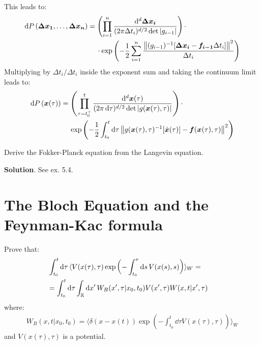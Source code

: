 \documentclass[../template.tex]{subfiles}
\begin{document}
\begin{exo}
    This leads to:
    \begin{align*}
        \dd{P}(\bm{\Delta x_1}, \dots,\bm{\Delta x_n}) &= \left(\prod_{i=1}^n \frac{\dd[d]{ \bm{\Delta x_i}}}{(2 \pi \Delta t_i)^{d/2} \operatorname{det}|g_{i-1}| }   \right) \cdot\\
        &\quad \> \cdot \exp\left(-\frac{1}{2} \sum_{i=1}^n \frac{\norm{(g_{i-1})^{-1} [ \bm{\Delta x_i} - \bm{f_{i-1}}\Delta t_i]}^2 }{\Delta t_i}  \right)
    \end{align*}
    Multiplying by $\Delta t_i / \Delta t_i$ inside the exponent sum and taking the continuum limit leads to:
    \begin{align*}
        \dd{P}(\bm{x}(\tau)) &= \left(\prod_{\tau=t_0^+}^t \frac{\dd[d]{\bm{x}(\tau)}}{(2 \pi \dd{\tau} )^{d/2} \operatorname{det}|g(\bm{x}(\tau), \tau)| } \right) \cdot \\
        &\quad \> \exp\left(-\frac{1}{2} \int_{t_0}^t \dd{\tau} \norm{g(\bm{x}(\tau), \tau)^{-1} [\dot{\bm{x}}(\tau)] - {\bm{f}(\bm{x}(\tau), \tau)} }^2 \right)
    \end{align*}
\end{exo}

\begin{exo}
    Derive the Fokker-Planck equation from the Langevin equation.
    \medskip

    \textbf{Solution}. See ex. 5.4. %
\end{exo}


\chapter{The Bloch Equation and the Feynman-Kac formula}
\begin{exo} Prove that:
    \begin{align*}
        \int_{t_0}^t \dd{\tau} \langle V(x(\tau), \tau) \exp\left(-\int_{t_0}^\tau \dd{s} V(x(s),s)\right) \rangle_W =\\
        = \int_{t_0}^t \dd{\tau} \int_{\mathbb{R}} \dd{x'} W_B(x',\tau|x_0,t_0) V(x',\tau)W(x,t|x',\tau) \span
    \end{align*}
    where:
    \begin{align*}
        W_B(x,t|x_0,t_0) = \langle \delta(x-x(t)) \exp\left(-\int_{t_0}^t \dd{\tau} V(x(\tau), \tau)\right) \rangle_W
    \end{align*}
    and $V(x(\tau),\tau)$ is a potential.
\end{exo}
\end{document}
